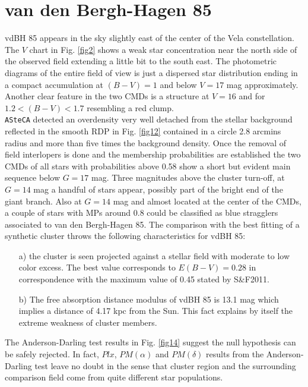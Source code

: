 \documentclass[draft]{aa}
\begin{document}
\section{van den Bergh-Hagen 85}

vdBH 85 appears in the sky slightly east of the center of the
Vela constellation. The $V$ chart in Fig. \ref{fig2} shows a weak star
concentration near the north side of the observed field extending a little bit
to the south east. The photometric diagrams of the entire field of view is just
a dispersed star distribution ending in a compact accumulation at $(B-V)=1$ and
below $V = 17$ mag approximately. Another clear feature in the two CMDs is a
structure at $V = 16$ and for $1.2 < (B-V) < 1.7$ resembling a red clump.\\

\texttt{ASteCA} detected an overdensity very well detached from the stellar
background reflected in the smooth RDP in Fig. \ref{fig12} contained in a circle
2.8 arcmins radius and more than five times the background density. Once the
removal of field interlopers is done and the membership probabilities are
established the two CMDs of all stars with probabilities above 0.58 show a
short but evident main sequence below $G=17$ mag.
Three magnitudes above the cluster turn-off, at $G=14$ mag a handful of stars
appear, possibly part of the bright end of the giant branch. Also at
$G=14$ mag and almost located at the center of the CMDs, a couple of stars with
MPs around 0.8 could be classified as blue stragglers associated to van den
Bergh-Hagen 85.
The comparison with the best fitting of a synthetic cluster throws the
following characteristics for vdBH 85:

\begin{itemize}
\item [a)] the cluster is seen projected against a stellar field with moderate
    to low color excess. The best value corresponds to $E(B-V) = 0.28$ in
    correspondence with the maximum value of 0.45 stated by S\&F2011.
\item [b)] The free absorption distance modulus of vdBH 85 is
    13.1 mag which implies a distance of 4.17 kpc from the Sun. This fact
    explains by itself the extreme weakness of cluster members.
\end{itemize}

The Anderson-Darling test results in Fig. \ref{fig14} suggest the null
hypothesis can be safely rejected. In fact, $Plx$, $PM(\alpha)$ and
$PM(\delta)$ results from the Anderson-Darling test leave no doubt in the sense
that cluster region and the surrounding comparison field come from quite
different star populations.\\
\end{document}
